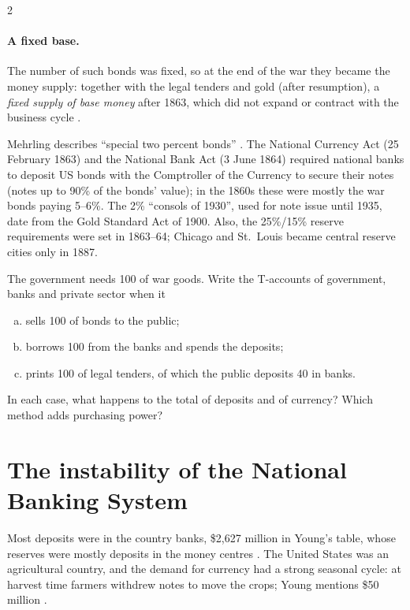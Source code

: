 \begin{paracol}{2}
\paragraph{A fixed base.} The number of such bonds was fixed, so at the end of the war they became the money supply: together with the
legal tenders and gold (after resumption), a \emph{fixed supply of base money} after 1863, which did not expand or contract with the
business cycle .

\begin{coursenote}
Mehrling describes ``special two percent bonds'' . The National Currency Act (25 February 1863) and the National Bank
Act (3 June 1864) required national banks to deposit US bonds with the Comptroller of the Currency to secure their notes (notes up to
90\% of the bonds' value); in the 1860s these were mostly the war bonds paying 5--6\%. The 2\% ``consols of 1930'', used for note
issue until 1935, date from the Gold Standard Act of 1900. Also, the 25\%/15\% reserve requirements were set in 1863--64; Chicago
and St.~Louis became central reserve cities only in 1887.
\end{coursenote}

\begin{exercise}
The government needs 100 of war goods. Write the T-accounts of government, banks and private sector when it
\begin{enumerate}[(a)]
  \item sells 100 of bonds to the public;
  \item borrows 100 from the banks and spends the deposits;
  \item prints 100 of legal tenders, of which the public deposits 40 in banks.
\end{enumerate}
In each case, what happens to the total of deposits and of currency? Which method adds purchasing power?
\end{exercise}

\section{The instability of the National Banking System}\label{sec:st-instability}

Most deposits were in the country banks, \$2,627 million in Young's table, whose reserves were mostly deposits in the money
centres . The United States was an agricultural country, and the demand for currency had a strong seasonal cycle: at
harvest time farmers withdrew notes to move the crops; Young mentions \$50 million .


\end{paracol}
